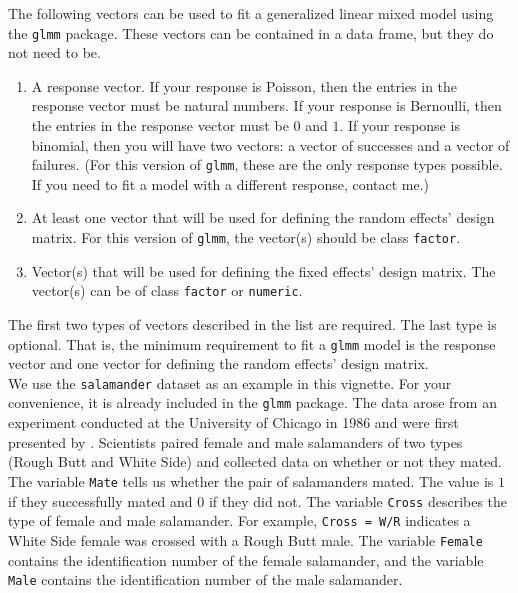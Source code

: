 \documentclass[11pt]{article}\usepackage[]{graphicx}\usepackage[]{color}
\begin{document}
The following vectors can be used to fit a generalized linear mixed model using the \texttt{glmm} package. These vectors can be contained in a data frame, but they do not need to be.
\begin{enumerate}
\item A response vector. If your response is Poisson, then the entries in the response vector must be natural numbers. If your response is Bernoulli, then the entries in the response vector must be $0$ and $1$. If your response is binomial, then you will have two vectors: a vector of successes and a vector of failures. (For this version of \texttt{glmm}, these are the only  response types possible. If you need to fit a model with a different response, contact me.) 
\item At least one vector that will be used for defining the random effects' design matrix. For this version of \texttt{glmm}, the vector(s) should be class \texttt{factor}.
\item Vector(s) that will be used for defining the fixed effects' design matrix. The vector(s) can be of class \texttt{factor} or \texttt{numeric}. 
\end{enumerate}
The first two types of vectors described in the list are required. The last type is optional. That is, the minimum requirement to fit a \texttt{glmm} model is the response vector and one vector for defining the random effects' design matrix. \\


We use the \texttt{salamander} dataset as an example in this vignette. For your convenience, it is already included in the \texttt{glmm} package. The data arose from an experiment conducted at the University of Chicago in 1986 and were first presented by \citet[section 14.5]{mcc:nelder:1989}. Scientists paired female and male salamanders of two types (Rough Butt and White Side) and collected data on whether or not they mated.  \\

The variable \texttt{Mate} tells us whether the pair of salamanders mated. The value is $1$ if they successfully mated and $0$ if they did not. The variable \texttt{Cross} describes the type of female and male salamander. For example, \texttt{Cross = W/R} indicates a White Side female was crossed with a Rough Butt male. The variable \texttt{Female} contains the identification number of the female salamander, and the variable \texttt{Male} contains the identification number of the male salamander.\\ 
\end{document}
